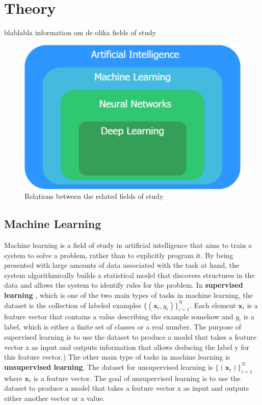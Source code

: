 \documentclass[nofilelist]{cslthse-msc}
\begin{document}
\chapter{Theory}

blablabla information om de olika fields of study

\begin{figure}[h!]
    \centering
    \includegraphics[scale=0.4]{msccls/explanatory_images/map_of_techniques.png}
    \caption{Relations between the related fields of study }
    \label{fig:map}
\end{figure}

\section{Machine Learning}
Machine learning \citep{franoischollet2017learning} is a field of study in artificial intelligence that aims to train a system to solve a problem, rather than to explicitly program it. By being presented with large amounts of data associated with the task at hand, the system algorithmically builds a statistical model that discovers structures in the data and allows the system to identify rules for the problem. 
In \textbf{supervised learning} \citep{100pageBurkov}, which is one of the two main types of tasks in machine learning, the dataset is the collection of labeled examples $\{(\mathbf{x}_i, y_i)\}_{i=1}^N.$ Each element $\mathbf{x}_i$ is a feature vector that contains a value describing the example somehow and $y_i$ is a label, which is either a finite set of classes or a real number. The purpose of supervised learning is to use the dataset to produce a model that takes a feature vector x as input and outputs information that allows deducing the label y for this feature vector.) 
The other main type of tasks in machine learning is \textbf{unsupervised learning}. The dataset for unsupervised learning is $\{ (\mathbf{x}_i)\}_{i=1}^N$ where $\mathbf{x}_i$ is a feature vector. The goal of unsupervised learning is to use the dataset to produce a model that takes a feature vector x as input and outputs either another vector or a value. 
\end{document}
